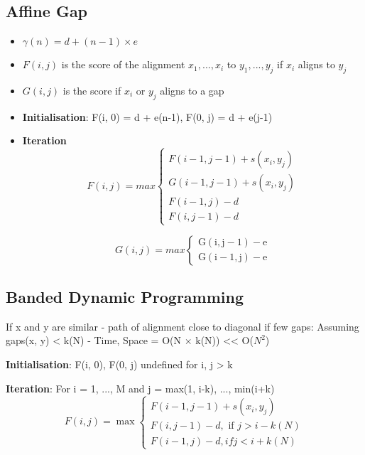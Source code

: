 \documentclass{article}
\begin{document}
\subsection{Affine Gap}
\begin{itemize}
    \item $\gamma (n) = d+(n-1) \times e$
    \item $F(i, j)$ is the score of the alignment $x_{1}, ..., x_{i}$ to $y_{1}, ..., y_{j}$ if $x_{i}$ aligns to $y_{j}$
    
    \item $G(i,j)$ is the score if $x_{i}$ or $y_{j}$ aligns to a gap
    \item \textbf{Initialisation}: F(i, 0) = d + e(n-1), F(0, j) = d + e(j-1)
    \item \textbf{Iteration}
    $$F(i, j) = max
\left\{\begin{array}{l}{F(i-1, j-1)+s\left(x_{i}, y_{j}\right)} \\ {G(i-1, j-1)+s\left(x_{i}, y_{j}\right)} \\ {F(i-1, j)-d} \\ {F(i, j-1)-d}\end{array}\right.
$$

$$G(i, j) = max
\left\{\begin{array}{l}{\mathrm{G}(\mathrm{i}, \mathrm{j}-1)-\mathrm{e}} \\ {\mathrm{G}(\mathrm{i}-1, \mathrm{j})-\mathrm{e}}\end{array}\right.
$$

    
\end{itemize}

\subsection{Banded Dynamic Programming}
If x and y are similar - path of alignment close to diagonal if few gaps: Assuming gaps(x, y) < k(N) - Time, Space = O(N $\times$ k(N)) << O($N^{2}$)


\textbf{Initialisation}: F(i, 0), F(0, j) undefined for i, j > k


\textbf{Iteration}: For i = 1, ..., M and j = max(1, i-k), ..., min(i+k)
 $$
F(i, j)=\max \left\{\begin{array}{l}{F(i-1, j-1)+s\left(x_{i}, y_{j}\right)} \\ {F(i, j-1)-d, \text { if  } j>i-k(N)} \\ {F(i-1, j)-d, if  j<i+k(N)}\end{array}\right.
$$
\end{document}
